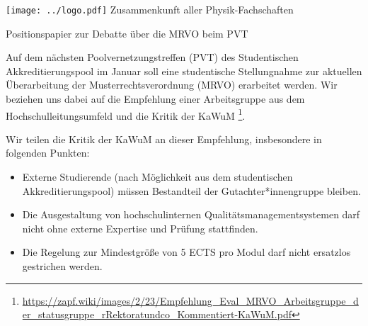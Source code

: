\documentclass[DIV=calc]{scrartcl}
\begin{document}
\hspace{0.87\textwidth}
\begin{minipage}{120pt}
	\vspace{-1.8cm}
	\texttt{[image: ../logo.pdf]}
	\centering
	\small Zusammenkunft aller Physik-Fachschaften
\end{minipage}

\begin{center}
  \huge{Positionspapier zur Debatte über die MRVO beim PVT}\vspace{.25\baselineskip}\\
  \normalsize
\end{center}
\vspace{1cm}






Auf dem nächsten Poolvernetzungstreffen (PVT) des Studentischen Akkreditierungspool im Januar soll eine studentische Stellungnahme zur aktuellen Überarbeitung der Musterrechtsverordnung (MRVO) erarbeitet werden. Wir beziehen uns dabei auf die Empfehlung einer Arbeitsgruppe aus dem Hochschulleitungsumfeld und die Kritik der KaWuM \footnote{\url{https://zapf.wiki/images/2/23/Empfehlung_Eval_MRVO_Arbeitsgruppe_der_statusgruppe_rRektoratundco_Kommentiert-KaWuM.pdf}}.

Wir teilen die Kritik der KaWuM an dieser Empfehlung, insbesondere in folgenden Punkten:
\begin{itemize}
\item Externe Studierende (nach Möglichkeit aus dem studentischen Akkreditierungspool) müssen Bestandteil der Gutachter*innengruppe bleiben.
\item Die Ausgestaltung von hochschulinternen Qualitätsmanagementsystemen darf nicht ohne externe Expertise und Prüfung stattfinden.
\item Die Regelung zur Mindestgröße von 5 ECTS pro Modul darf nicht ersatzlos gestrichen werden.
\end{itemize}
\end{document}
